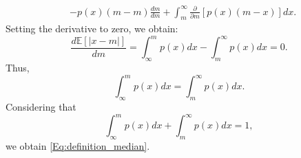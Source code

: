 \documentclass{aa}
\begin{document}
\begin{appendix}
\begin{align}
    & - p(x)(m-m)\frac{dm}{dm}+\int_{m}^{\infty}\frac{\partial}{\partial m}[p(x)(m-x)]dx \nonumber .
\end{align}
Setting the derivative to zero, we obtain:
\begin{equation}
    \frac{d\mathbb{E}[|x-m|]}{dm}= \int_{\infty}^{m} p(x)dx-\int_{m}^{\infty}p(x)dx =0.
\end{equation}
Thus,
\begin{equation}
\int_{\infty}^{m} p(x)dx=\int_{m}^{\infty}p(x)dx .
\end{equation}
Considering that
\begin{equation}
\int_{\infty}^{m} p(x)dx+\int_{m}^{\infty}p(x)dx=1,
\end{equation}
we obtain \autoref{Eq:definition_median}.
\end{appendix}
\end{document}

